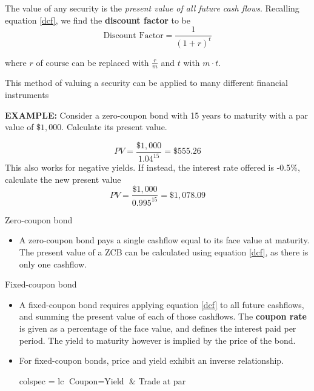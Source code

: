 \documentclass[../notes_compiled.tex]{subfiles}
\begin{document}
\begin{itemize}
\item The value of any security is the \emph{present value of all future cash flows}. Recalling equation \ref{dcf}, we find the \textbf{discount factor} to be
\begin{equation}
\text{Discount Factor} = \frac{1}{(1+r)^{t}}
\end{equation}
\item[] where $r$ of course can be replaced with $\frac{r}{m}$ and $t$ with $m\cdot t$.
\item This method of valuing a security can be applied to many different financial instruments
{\color{RedViolet}
\item[] \textbf{EXAMPLE:} Consider a zero-coupon bond with 15 years to maturity with a par value of $\$1,000$. Calculate its present value.
}
{\color{RoyalBlue}
\begin{equation*}
PV = \frac{\$1,000}{1.04^{15}}=\$555.26
\end{equation*}
}
{\color{RedViolet}
This also works for negative yields. If instead, the interest rate offered is -0.5\%, calculate the new present value
}
{\color{RoyalBlue}
\begin{equation*}
PV = \frac{\$1,000}{0.995^{15}} = \$1,078.09
\end{equation*}
}
\item[] Zero-coupon bond
\begin{itemize}
\item[] A zero-coupon bond pays a single cashflow equal to its face value at maturity. The present value of a ZCB can be calculated using equation \ref{dcf}, as there is only one cashflow.
\end{itemize}
\item[] Fixed-coupon bond
\begin{itemize}
\item[] A fixed-coupon bond requires applying equation \ref{dcf} to all future cashflows, and summing the present value of each of those cashflows. The \textbf{coupon rate} is given as a percentage of the face value, and defines the interest paid per period. The yield to maturity however is implied by the price of the bond.
\item[] For fixed-coupon bonds, price and yield exhibit an inverse relationship. 
\begin{table}[h!]
\centering
\begin{tblr}{colspec = {lc}}
\hline[1.25pt]
$\text{Coupon} = \text{Yield}$ & Trade at par \\

\end{tblr}
\end{table}
\end{itemize}
\end{itemize}
\end{document}
